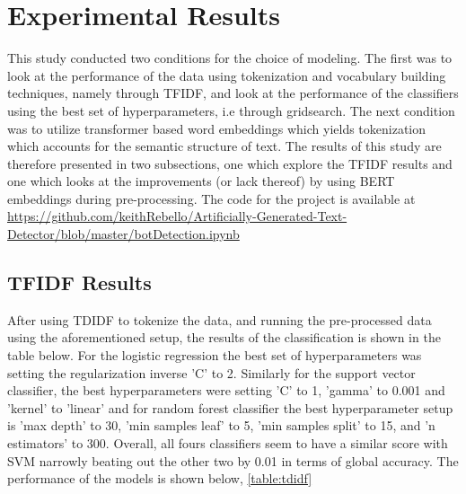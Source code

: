 \documentclass[12pt]{article}
\begin{document}
\section{Experimental Results}
This study conducted two conditions for the choice of modeling.  The first was to look at the performance of the data using tokenization and vocabulary building techniques, namely through TFIDF, and look at the performance of the classifiers using the best set of hyperparameters, i.e through gridsearch. The next condition was to utilize transformer based word embeddings which yields tokenization which accounts for the semantic structure of text. The results of this study are therefore presented in two subsections, one which explore the TFIDF results and one which looks at the improvements  (or lack thereof) by using BERT embeddings during pre-processing. 
The code for the project is available at \url{https://github.com/keithRebello/Artificially-Generated-Text-Detector/blob/master/botDetection.ipynb}

\subsection{TFIDF Results}
After using TDIDF to tokenize the data, and running the pre-processed data using the aforementioned setup, the results of the classification is shown in the table below. For the logistic regression the best set of hyperparameters was setting the regularization inverse 'C' to 2. Similarly for the support vector classifier, the best hyperparameters were setting 'C' to 1, 'gamma' to 0.001 and 'kernel' to 'linear' and for random forest classifier the best hyperparameter setup is 'max depth' to 30, 'min samples leaf' to 5, 'min samples split' to 15, and 'n estimators' to 300. Overall, all fours classifiers seem to have a similar score with SVM narrowly beating out the other two by 0.01 in terms of global accuracy. The performance of the models is shown below, \ref{table:tdidf}
\end{document}
